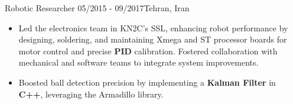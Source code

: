 \resumeSubheadingReza
{Robotic Researcher}{}
{05/2015 - 09/2017}{Tehran, Iran}
{
    \vspace{-12pt}
    \begin{itemize}
        \item{Led the electronics team in KN2C's SSL, enhancing robot performance by designing, soldering, and maintaining Xmega and ST processor boards for motor control and precise \textbf{PID} calibration. Fostered collaboration with mechanical and software teams to integrate system improvements.}
        \item{Boosted ball detection precision by implementing a \textbf{Kalman Filter} in \textbf{C++}, leveraging the Armadillo library.}
    \end{itemize}
}


